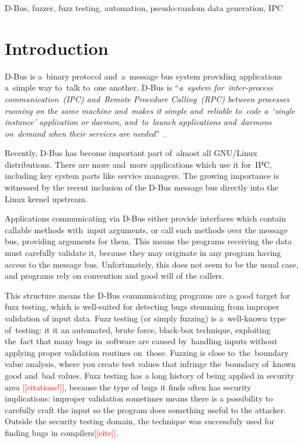 \documentclass[conference]{IEEEtran}
\newcommand{\addtodo}[1]{\textcolor{red}{[[#1]]}}
\begin{document}
\begin{keywords}
D-Bus, fuzzer, fuzz testing, automation, pseudo-random data generation, IPC
\end{keywords}

%
\IEEEpeerreviewmaketitle



\section{Introduction}
D-Bus is a~binary protocol and~a~message bus system providing applications
a~simple way to~talk to~one another. D-Bus is ``\emph{a~system for~\mbox{inter-process}
communication~(IPC) and~Remote Procedure Calling~(RPC) between
processes running on the same machine and~makes it simple and~reliable to~code
a~`single instance' application or daemon, and~to~launch applications and~daemons
on~demand when their services are needed}''~\cite{DBUS}.

Recently, D-Bus has become important part of~almost all GNU/Linux
distributions. There are more and~more applications which use it for~IPC,
including key system parts like service managers. The growing importance is witnessed
by the recent inclusion of the D-Bus message bus directly into the Linux kernel
upstream.

Applications communicating via D-Bus either provide interfaces which contain callable
methods with~input arguments, or call such methods over
the message bus, providing arguments for them. This means the programs
receiving the data must carefully validate it, because they may originate in
any program having access to the message bus. Unfortunately, this does not seem
to be the usual case, and programs rely on convention and good will of the
callers.

This structure means the D-Bus communicating programs are a good target for
fuzz testing, which is well-suited for detecting bugs stemming from improper
validation of input data. Fuzz testing (or simply fuzzing) is a~well-known type
of~testing\cite{Fuzzing2, Fuzzing}: it it an automated, brute force, black-box
technique, exploiting the~fact that many bugs in~software are caused
by~handling inputs without applying proper validation routines on~those.
Fuzzing is close to~the~boundary value analysis, where you create test values
that infringe the~boundary of~known good and~bad values.  Fuzz testing has a
long history of being applied in security area \addtodo{citations!}, because
the type of bugs it finds often has security implications: improper validation
sometimes means there is a possibility to carefully craft the input so the
program does something useful to the attacker. Outside the security testing
domain, the technique was successfuly used for finding bugs in
compilers\addtodo{cite}.
\end{document}
